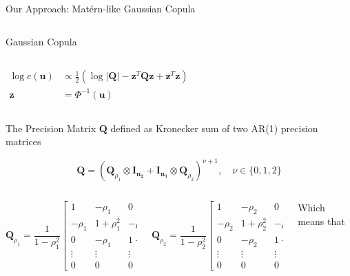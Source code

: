 \documentclass[
  ignorenonframetext,
]{beamer}
\begin{document}
\begin{frame}{Our Approach: Matérn-like Gaussian Copula}
\begin{columns}[T]
\begin{block}{Gaussian Copula}
\begin{column}{0.5\textwidth}
\[
\begin{aligned}
\log c(\mathbf u) &\propto \frac{1}{2}\left(\log |\mathbf{Q}| - \mathbf{z}^T\mathbf{Q}\mathbf{z} + \mathbf{z}^T\mathbf{z}\right) \\
\mathbf{z} &= \Phi^{-1}(\mathbf u)
\end{aligned}
\]
\end{column}
\end{block}
\end{columns}
\end{frame}

\begin{frame}{The Precision Matrix}
\label{the-precision-matrix}
\(\mathbf Q\) defined as Kronecker sum of two AR(1) precision matrices

\[
\mathbf{Q} = \left( \mathbf{Q}_{\rho_1} \otimes \mathbf{I_{n_2}} + \mathbf{I_{n_1}} \otimes \mathbf{Q}_{\rho_2} \right)^{\nu + 1}, \quad \nu \in \{0, 1, 2\}
\]

\begin{columns}[T]
\begin{column}{0.5\textwidth}
\[
\mathbf{Q}_{\rho_{1}} = \frac{1}{1-\rho_{1}^2}
\begin{bmatrix}
1 & -\rho_{1} & 0 & \cdots & 0 \\
-\rho_{1} & 1+\rho_{1}^2 & -\rho_{1} & \cdots & 0 \\
0 & -\rho_{1} & 1+\rho_{1}^2 & \cdots & 0 \\
\vdots & \vdots & \vdots & \ddots & \vdots \\
0 & 0 & 0 & \cdots & 1
\end{bmatrix}
\]
\end{column}

\begin{column}{0.5\textwidth}
\[
\mathbf{Q}_{\rho_{2}} = \frac{1}{1-\rho_{2}^2}
\begin{bmatrix}
1 & -\rho_{2} & 0 & \cdots & 0 \\
-\rho_{2} & 1+\rho_{2}^2 & -\rho_{2} & \cdots & 0 \\
0 & -\rho_{2} & 1+\rho_{2}^2 & \cdots & 0 \\
\vdots & \vdots & \vdots & \ddots & \vdots \\
0 & 0 & 0 & \cdots & 1
\end{bmatrix}
\]
\end{column}

Which means that


\end{columns}
\end{frame}
\end{document}

